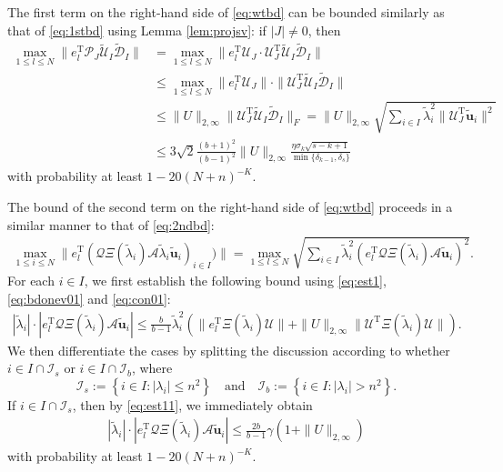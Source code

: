 \documentclass[reqno]{amsart}
\newcommand{\T}{\mathrm{T}}
\theoremstyle{plain}
\theoremstyle{definition}
\begin{document}
The first term on the right-hand side of \eqref{eq:wtbd} can be bounded similarly as that of \eqref{eq:1stbd} using Lemma \ref{lem:projsv}: if $|J| \neq 0$, then
\begin{align*}
\max_{1\le l \le N} \|e_l^\T \mathcal P_J \widetilde{\mathcal U}_I  \widetilde{\mathcal D}_I\| &= \max_{1\le l \le N} \|e_l^\T \mathcal U_J \cdot \mathcal U_J^\T \widetilde{\mathcal U}_I  \widetilde{\mathcal D}_I\|\\
&\le \max_{1\le l \le N} \|e_l^\T \mathcal U_J\| \cdot \| \mathcal U_J^\T \widetilde{\mathcal U}_I  \widetilde{\mathcal D}_I\|  \\
&\le \| U\|_{2,\infty}  \| \mathcal U_J^\T \widetilde{\mathcal U}_I  \widetilde{\mathcal D}_I\|_F = \| U\|_{2,\infty}  \sqrt{\sum_{i\in I}\widetilde \lambda_i^2 \| \mathcal U_J^\T \widetilde{\mathbf u}_i \|^2}\\
&\le  3\sqrt{2}\frac{(b+1)^2}{(b-1)^2}  \| U\|_{2,\infty} \frac{\eta \sigma_k \sqrt{s-k+1}}{\min\{\delta_{k-1}, \delta_s\}}
\end{align*}
with probability at least $1-20(N+n)^{-K}$.

The bound of the second term on the right-hand side of \eqref{eq:wtbd} proceeds in a similar manner to that of \eqref{eq:2ndbd}:
\begin{align}\label{eq:wtbd00}
\max_{1\le i \le N} \| e_l^\T (\mathcal Q \Xi(\widetilde \lambda_i) \mathcal A \widetilde \lambda_i \widetilde{\mathbf u}_i)_{i\in I})\|=\max_{1\le l \le N} \sqrt{\sum_{i\in I} \widetilde \lambda_i^2  (e_l^\T \mathcal Q \Xi(\widetilde \lambda_i) \mathcal A \widetilde{\mathbf u}_i)^2}.
\end{align}
For each $i\in I$, we first establish the following bound using \eqref{eq:est1}, \eqref{eq:bdonev01} and \eqref{eq:con01}:
\begin{align}\label{eq:wtbd01}
|\widetilde \lambda_i | \cdot \left| e_l^\T \mathcal Q \Xi(\widetilde \lambda_i) \mathcal A \widetilde{\mathbf u}_i \right| \le \frac{b}{b-1} \widetilde \lambda_i^2 \left( \|e_l^\T  \Xi(\widetilde \lambda_i) \mathcal U \| + \| U \|_{2,\infty} \|\mathcal U^\T \Xi(\widetilde \lambda_i) \mathcal U \|\right).
\end{align}
We then differentiate the cases by splitting the discussion according to whether $i\in I \cap \mathcal I_s$ or $i\in I \cap \mathcal I_b$, where 
$$\mathcal I_s := \left\{ i \in I: | \lambda_i| \le n^2 \right\} \quad\text{and}\quad \mathcal I_b := \left\{ i \in I: | \lambda_i| > n^2 \right\}.$$
If $i\in I \cap \mathcal I_s$, then by \eqref{eq:est11}, we immediately obtain
\begin{align}\label{eq:wtbd02}
|\widetilde \lambda_i | \cdot \left| e_l^\T \mathcal Q \Xi(\widetilde \lambda_i) \mathcal A \widetilde{\mathbf u}_i \right| \le \frac{2b}{b-1}\gamma (1+ \|U\|_{2,\infty})
\end{align}
with probability at least $1-20(N+n)^{-K}$.
\end{document}

